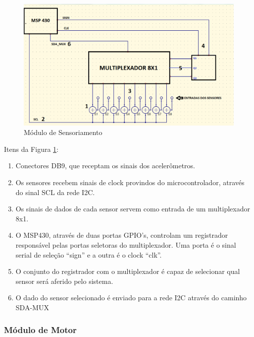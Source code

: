 \begin{figure}[htbp]
    \centering
        \includegraphics[scale=0.6]{figuras/mod_sensor.png}
    \caption{Módulo de Sensoriamento}
    \label{mod_sensor}
\end{figure}

Itens da Figura \ref{mod_sensor}:

\begin{enumerate}
    \item Conectores DB9, que receptam os sinais dos acelerômetros.
    \item Os sensores recebem sinais de clock provindos do microcontrolador, através do sinal SCL da rede I2C.
    \item Os sinais de dados de cada sensor servem como entrada de um multiplexador 8x1.
    \item O MSP430, através de duas portas GPIO's, controlam um registrador responsável pelas portas seletoras do multiplexador. Uma porta é o sinal serial de seleção “sign” e a outra é o clock “clk”.
    \item O conjunto do registrador com o multiplexador é capaz de selecionar qual sensor será aferido pelo sistema.
    \item O dado do sensor selecionado é enviado para a rede I2C através do caminho SDA-MUX
\end{enumerate}

\subsubsection*{Módulo de Motor}

